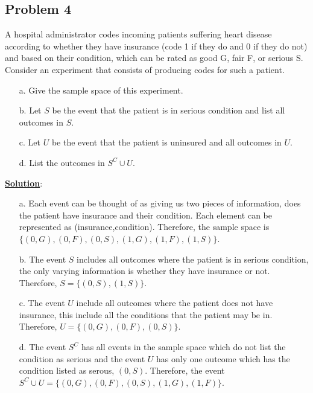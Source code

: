 \documentclass[11pt,letter paper]{report}
\begin{document}
\subsection*{Problem 4}
A hospital administrator codes incoming patients suffering heart disease according to whether they have insurance (code 1 if they do and 0 if they do not) and based on their condition, which can be rated as good G, fair F, or serious S. Consider an experiment that consists of producing codes for such a patient.
\begin{itemize}
\item[a.] Give the sample space of this experiment.
\item[b.] Let $S$ be the event that the patient is in serious condition and list all outcomes in $S$. 
\item[c.] Let $U$ be the event that the patient is uninsured and all outcomes in $U$. 
\item[d.] List the outcomes in $S^C \cup U$.
\end{itemize}
{\bf \underline{Solution}}:
\begin{itemize}
\item[a.] Each event can be thought of as giving us two pieces of information, does the patient have insurance and their condition. Each element can be represented as (insurance,condition). Therefore, the sample space is $\lbrace(0,G),(0,F),(0,S),(1,G),(1,F),(1,S)\rbrace$.
\item[b.] The event $S$ includes all outcomes where the patient is in serious condition, the only varying information is whether they have insurance or not. Therefore, $S=\lbrace(0,S),(1,S)\rbrace$. 
\item[c.] The event $U$ include all outcomes where the patient does not have insurance, this include all the conditions that the patient may be in. Therefore, $U=\lbrace(0,G),(0,F),(0,S)\rbrace$.
\item[d.] The event $S^C$ has all events in the sample space which do not list the condition as serious and the event $U$ has only one outcome which has the condition listed as serous, $(0,S)$. Therefore, the event $S^C\cup U=\lbrace(0,G),(0,F),(0,S),(1,G),(1,F)\rbrace$.
\end{itemize}

\end{document}
